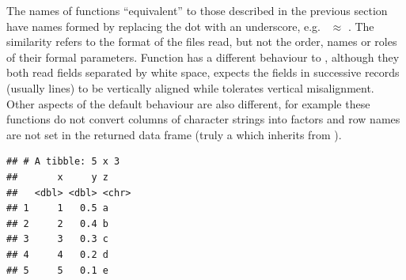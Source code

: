 \documentclass[krantz2]{krantz}\usepackage{knitr}%
\begin{document}
\begin{warningbox}
The names of functions ``equivalent'' to those described in the previous section have names formed by replacing the dot with an underscore, e.g.\  $\approx$ . The similarity refers to the format of the files read, but not the order, names or roles of their formal parameters. Function  has a different behaviour to , although they both read fields separated by white space,  expects the fields in successive records (usually lines) to be vertically aligned while  tolerates vertical misalignment. Other aspects of the default behaviour are also different, for example these functions do not convert columns of character strings into factors and row names are not set in the returned data frame (truly a  which inherits from ).
\end{warningbox}

\begin{knitrout}\footnotesize
{}\color{fgcolor}\begin{kframe}
\begin{alltt}
\hlstd{(} \hlstd{=} \hlstd{)}
\end{alltt}


{\ttfamily\noindent\itshape\color{messagecolor}{\#\# Parsed with column specification:\\\#\# cols(\\\#\#\ \  x = col\_double(),\\\#\#\ \  y = col\_double(),\\\#\#\ \  z = col\_character()\\\#\# )}}\begin{verbatim}
## # A tibble: 5 x 3
##       x     y z    
##   <dbl> <dbl> <chr>
## 1     1   0.5 a    
## 2     2   0.4 b    
## 3     3   0.3 c    
## 4     4   0.2 d    
## 5     5   0.1 e
\end{verbatim}
\end{kframe}
\end{knitrout}
\end{document}
